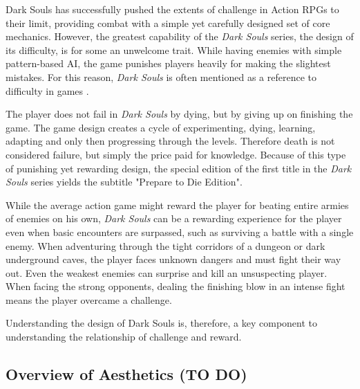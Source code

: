 Dark Souls has successfully pushed the extents of challenge in Action RPGs to their limit, providing combat with a simple yet carefully designed set of core mechanics. However, the greatest capability of the \emph{Dark Souls} series, the design of its difficulty, is for some an unwelcome trait. While having enemies with simple pattern-based AI, the game punishes players heavily for making the slightest mistakes. For this reason, \emph{Dark Souls} is often mentioned as a reference to difficulty in games \cite{URL_ExploringDesignOfDarkSouls}.

The player does not fail in \emph{Dark Souls} by dying, but by giving up on finishing the game. The game design creates a cycle of experimenting, dying, learning, adapting and only then progressing through the levels. Therefore death is not considered failure, but simply the price paid for knowledge. Because of this type of punishing yet rewarding design, the special edition of the first title in the \emph{Dark Souls} series yields the subtitle "Prepare to Die Edition".

While the average action game might reward the player for beating entire armies of enemies on his own, \emph{Dark Souls} can be a rewarding experience for the player even when basic encounters are surpassed, such as surviving a battle with a single enemy. When adventuring through the tight corridors of a dungeon or dark underground caves, the player faces unknown dangers and must fight their way out. Even the weakest enemies can surprise and kill an unsuspecting player. When facing the strong opponents, dealing the finishing blow in an intense fight means the player overcame a challenge.

Understanding the design of Dark Souls is, therefore, a key component to understanding the relationship of challenge and reward.


\subsection{Overview of Aesthetics (TO DO)}


